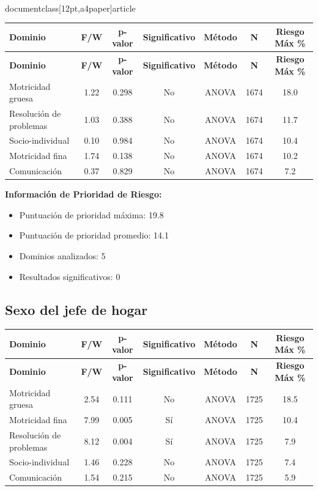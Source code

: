 \\documentclass[12pt,a4paper]{article}
\begin{document}
\begin{longtable}{|l|c|c|c|c|c|c|}
\hline
\textbf{Dominio} & \textbf{F/W} & \textbf{p-valor} & \textbf{Significativo} & \textbf{Método} & \textbf{N} & \textbf{Riesgo Máx \%} \\
\hline
\endfirsthead

\hline
\textbf{Dominio} & \textbf{F/W} & \textbf{p-valor} & \textbf{Significativo} & \textbf{Método} & \textbf{N} & \textbf{Riesgo Máx \%} \\
\hline
\endhead

\hline
\endfoot

\hline
\endlastfoot

Motricidad gruesa & 1.22 & 0.298 & No & ANOVA & 1674 & 18.0 \\
Resolución de problemas & 1.03 & 0.388 & No & ANOVA & 1674 & 11.7 \\
Socio-individual & 0.10 & 0.984 & No & ANOVA & 1674 & 10.4 \\
Motricidad fina & 1.74 & 0.138 & No & ANOVA & 1674 & 10.2 \\
Comunicación & 0.37 & 0.829 & No & ANOVA & 1674 & 7.2 \\

\end{longtable}


\textbf{Información de Prioridad de Riesgo:}
\begin{itemize}
\item Puntuación de prioridad máxima: 19.8
\item Puntuación de prioridad promedio: 14.1
\item Dominios analizados: 5
\item Resultados significativos: 0
\end{itemize}


\subsection{Sexo del jefe de hogar}


\begin{longtable}{|l|c|c|c|c|c|c|}
\hline
\textbf{Dominio} & \textbf{F/W} & \textbf{p-valor} & \textbf{Significativo} & \textbf{Método} & \textbf{N} & \textbf{Riesgo Máx \%} \\
\hline
\endfirsthead

\hline
\textbf{Dominio} & \textbf{F/W} & \textbf{p-valor} & \textbf{Significativo} & \textbf{Método} & \textbf{N} & \textbf{Riesgo Máx \%} \\
\hline
\endhead

\hline
\endfoot

\hline
\endlastfoot

Motricidad gruesa & 2.54 & 0.111 & No & ANOVA & 1725 & 18.5 \\
Motricidad fina & 7.99 & 0.005 & Sí & ANOVA & 1725 & 10.4 \\
Resolución de problemas & 8.12 & 0.004 & Sí & ANOVA & 1725 & 7.9 \\
Socio-individual & 1.46 & 0.228 & No & ANOVA & 1725 & 7.4 \\
Comunicación & 1.54 & 0.215 & No & ANOVA & 1725 & 5.9 \\

\end{longtable}
\end{document}
